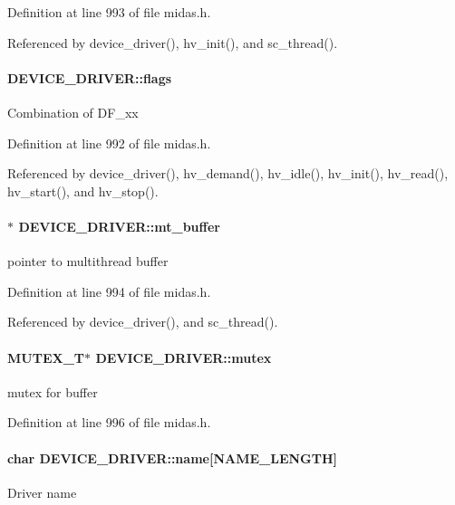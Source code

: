 Definition at line 993 of file midas.h.

Referenced by device\_\-driver(), hv\_\-init(), and sc\_\-thread().
\paragraph[{flags}]{ {\bf DEVICE\_\-DRIVER::flags}}\hfill\label{structDEVICE__DRIVER_ac40f8fcceded9b51b8a772a66f874087}
Combination of DF\_\-xx 

Definition at line 992 of file midas.h.

Referenced by device\_\-driver(), hv\_\-demand(), hv\_\-idle(), hv\_\-init(), hv\_\-read(), hv\_\-start(), and hv\_\-stop().
\paragraph[{mt\_\-buffer}]{$\ast$ {\bf DEVICE\_\-DRIVER::mt\_\-buffer}}\hfill\label{structDEVICE__DRIVER_a4b3a73f364d8f40376824d1ac2a95eb7}
pointer to multithread buffer 

Definition at line 994 of file midas.h.

Referenced by device\_\-driver(), and sc\_\-thread().
\paragraph[{mutex}]{\setlength{\rightskip}{0pt plus 5cm}MUTEX\_\-T$\ast$ {\bf DEVICE\_\-DRIVER::mutex}}\hfill\label{structDEVICE__DRIVER_a52c55da2a3d4add54467c2d3ded27507}
mutex for buffer 

Definition at line 996 of file midas.h.
\paragraph[{name}]{\setlength{\rightskip}{0pt plus 5cm}char {\bf DEVICE\_\-DRIVER::name}\mbox{[}NAME\_\-LENGTH\mbox{]}}\hfill\label{structDEVICE__DRIVER_a3c47bfe572999fec51df9c6072d6c6d7}
Driver name 

